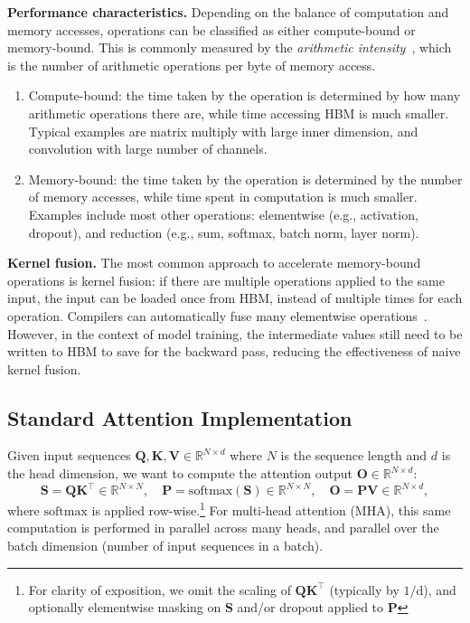 \message{ !name(../flash2.tex)}\documentclass{article}
\newcommand{\softmax}{\mathrm{softmax}}
\newcommand{\vQ}{\mathbf{Q}}
\newcommand{\vK}{\mathbf{K}}
\newcommand{\vV}{\mathbf{V}}
\newcommand{\vS}{\mathbf{S}}
\newcommand{\vP}{\mathbf{P}}
\newcommand{\vO}{\mathbf{O}}
\begin{document}
\textbf{Performance characteristics.} Depending on the balance of computation and memory accesses, operations can be
classified as either compute-bound or memory-bound.
This is commonly measured by the \emph{arithmetic intensity}~\citep{williams2009roofline},
which is the number of arithmetic operations per byte of memory access.
\begin{enumerate}[itemsep=0.1pt,topsep=0pt,leftmargin=*]
  \item Compute-bound: the time taken by the operation is determined by how many
  arithmetic operations there are, while time accessing HBM
  is much smaller. Typical examples are matrix multiply with large inner
  dimension, and convolution with large number of channels.
  \item Memory-bound: the time taken by the operation is determined by the
  number of memory accesses, while time spent in computation is much smaller.
  Examples include most other operations:
  elementwise (e.g., activation, dropout), and reduction (e.g., sum,
  softmax, batch norm, layer norm).
\end{enumerate}

\textbf{Kernel fusion.}
The most common approach to accelerate memory-bound operations is
kernel fusion: if there are multiple operations applied to the same input,
the input can be loaded once from HBM, instead of multiple times for each operation.
Compilers can automatically fuse many elementwise operations~\citep{li2020deep, paszke2019pytorch, sabne2020xla}.
However, in the context of model training, the intermediate values still need
to be written to HBM to save for the backward pass, reducing the
effectiveness of naive kernel fusion.

\subsection{Standard Attention Implementation}
\label{subsec:standard_attn}

Given input sequences $\vQ, \vK, \vV \in \mathbb{R}^{N \times d}$ where $N$ is the sequence length and
$d$ is the head dimension, we want to compute the attention output $\vO \in \mathbb{R}^{N \times d}$:
\begin{equation*}
  \vS = \vQ \vK^\top \in \mathbb{R}^{N \times N}, \quad \vP = \softmax(\vS) \in \mathbb{R}^{N \times N}, \quad \vO = \vP\vV \in \mathbb{R}^{N \times d},
\end{equation*}
where $\softmax$ is applied row-wise.\footnote{For clarity of exposition, we
  omit the scaling of $\vQ \vK^\top$ (typically by $1/\mathrm{d}$), and optionally
  elementwise masking on $\vS$ and/or dropout applied to $\vP$} For multi-head
attention (MHA), this same computation is performed in parallel across many
heads, and parallel over the batch dimension (number of input sequences in a
batch).
\end{document}

